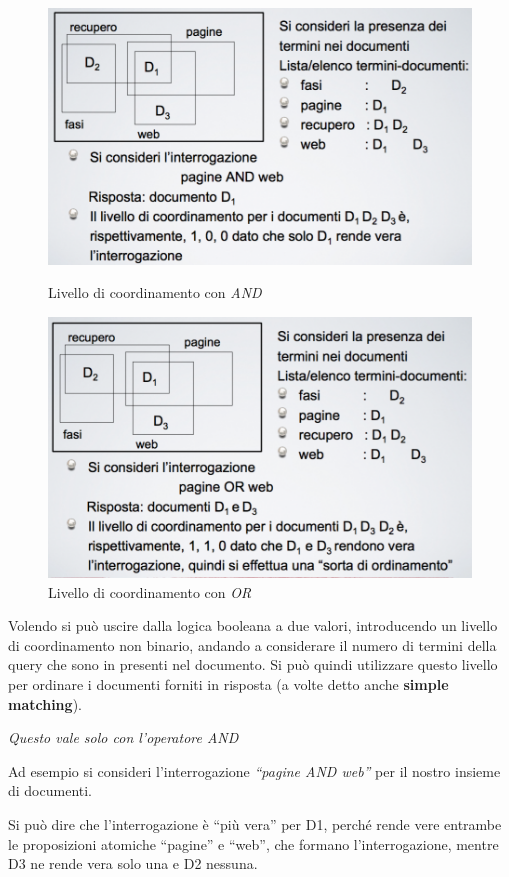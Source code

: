 \begin{figure}[ht]
	\centering
	\begin{minipage}[b]{0.45\linewidth}
		\centering
		\includegraphics[width=0.7\linewidth]{images/l8-set-1}
		\caption{Livello di coordinamento con \textit{AND}}
		
	\end{minipage}
	\quad
	\begin{minipage}[b]{0.45\linewidth}
		\centering
		\includegraphics[width=0.7\linewidth]{images/l8-set-2}
		\caption{Livello di coordinamento con \textit{OR}}
	\end{minipage}
\end{figure}

\noindent Volendo si può uscire dalla logica booleana a due valori, introducendo un livello di coordinamento non binario, andando a considerare il numero di termini della query che sono in presenti nel documento.
Si può quindi utilizzare questo livello per ordinare i documenti forniti in risposta (a volte detto anche \textbf{simple matching}).

\textit{Questo vale solo con l'operatore AND}

Ad esempio si consideri l'interrogazione \textit{``pagine AND web''} per il nostro insieme di documenti.

Si può dire che l'interrogazione è ``più vera'' per D1, perché rende vere entrambe le proposizioni atomiche ``pagine'' e ``web'', che formano l'interrogazione, mentre D3 ne rende vera solo una e D2 nessuna.

